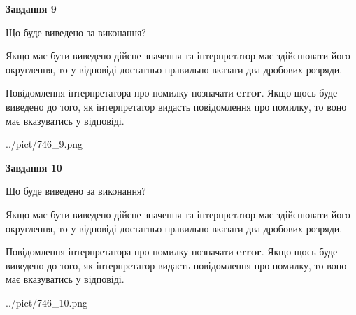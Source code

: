 \documentclass[12pt, ukrainian]{article}
\begin{document}
{\begin {Large}
{\begin {center}\textbf{Завдання 9}\end {center}}\par
Що буде виведено за виконання? \par

Якщо має бути виведено дійсне значення та інтерпретатор має здійснювати його округлення, 
то у відповіді достатньо правильно вказати два дробових розряди.

Повідомлення інтерпретатора про помилку позначати \textbf{error}.
Якщо щось буде виведено до того, як інтерпретатор видасть повідомлення про помилку, 
то воно має вказуватись у відповіді. \par

\begin{center}
	{../pict/746_9.png}
\end{center}
\newpage

{\begin {center}\textbf{Завдання 10}\end {center}}\par
Що буде виведено за виконання? \par

Якщо має бути виведено дійсне значення та інтерпретатор має здійснювати його округлення, 
то у відповіді достатньо правильно вказати два дробових розряди.

Повідомлення інтерпретатора про помилку позначати \textbf{error}.
Якщо щось буде виведено до того, як інтерпретатор видасть повідомлення про помилку, 
то воно має вказуватись у відповіді. \par

\begin{center}
	{../pict/746_10.png}
\end{center}
\newpage

\end {Large}}
\end{document}
